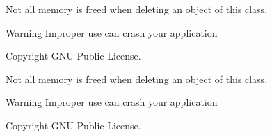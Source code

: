 
\begin{DoxyRefList}
\item[\label{bug__bug000001}%
\hypertarget{bug__bug000001}{}%
Global \hyperlink{link__list_8h_a682f531e759e6edca2fba6c56a0b6298}{node} ]Not all memory is freed when deleting an object of this class. \begin{DoxyWarning}{Warning}
Improper use can crash your application 
\end{DoxyWarning}
\begin{DoxyCopyright}{Copyright}
G\+N\+U Public License.  
\end{DoxyCopyright}

\item[\label{bug__bug000001}%
\hypertarget{bug__bug000001}{}%
Global \hyperlink{link__list_8h_a682f531e759e6edca2fba6c56a0b6298}{node} ]Not all memory is freed when deleting an object of this class. \begin{DoxyWarning}{Warning}
Improper use can crash your application 
\end{DoxyWarning}
\begin{DoxyCopyright}{Copyright}
G\+N\+U Public License. 
\end{DoxyCopyright}

\end{DoxyRefList}